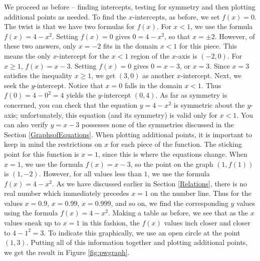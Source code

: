 {
We proceed as before -- finding intercepts, testing for symmetry and then plotting additional points as needed.  To find the $x$-intercepts, as before, we set $f(x)=0$.  The twist is that we have two formulas for $f(x)$.  For $x<1$, we use the formula $f(x) = 4-x^2$.  Setting $f(x) = 0$ gives $0 = 4 - x^2$, so that $x = \pm 2$.  However, of these two answers, only $x = -2$ fits in the domain $x < 1$ for this piece.  This means the only $x$-intercept for the $x < 1$ region of the $x$-axis is $(-2,0)$.  For $x \geq 1$, $f(x) = x-3$.  Setting $f(x) = 0$ gives  $0 = x-3$,  or $x=3$.  Since $x=3$ satisfies the inequality $x \geq 1$, we get $(3,0)$ as another $x$-intercept.  Next, we seek the $y$-intercept.  Notice that $x=0$ falls in the domain $x < 1$. Thus $f(0) = 4 - 0^2 = 4$ yields the $y$-intercept $(0,4)$.  As far as symmetry is concerned, you can check that the equation $y = 4 - x^2$ is symmetric about the $y$-axis;  unfortunately, this equation (and its symmetry) is valid only for $x < 1$.  You can also verify $y = x - 3$ possesses none of the symmetries discussed in the Section \ref{GraphsofEquations}. When plotting additional points, it is important to keep in mind the restrictions on $x$ for each piece of the function.  The sticking point for this function is $x=1$, since this is where the equations change.  When $x=1$, we use the formula $f(x) = x-3$, so the point on the graph $(1, f(1))$ is $(1,-2)$.  However, for all values less than $1$, we use the formula $f(x) = 4 - x^2$.  As we have discussed earlier in Section \ref{Relations}, there is no real number which immediately precedes $x=1$ on the number line.  Thus for the values $x = 0.9$, $x = 0.99$, $x=0.999$, and so on, we find the corresponding $y$ values using the formula $f(x) = 4 - x^2$.  Making a table as before, we see that as the $x$ values sneak up to $x=1$ in this fashion, the $f(x)$ values inch closer and closer to $4 - 1^2 = 3$.  To indicate this graphically, we use an open circle at the point $(1,3)$.  Putting all of this information together and plotting additional points, we get the result in Figure \ref{fig:pwgraph}.
}

\medskip


